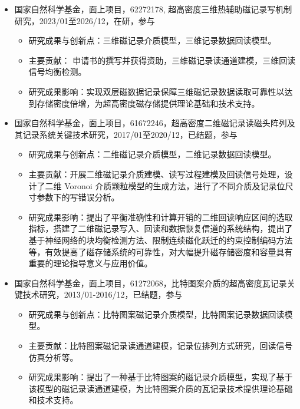 \documentclass[zh]{resume}
\begin{document}
\begin{itemize}
  \item 国家自然科学基金，面上项目，62272178, 超高密度三维热辅助磁记录写机制研究，2023/01至2026/12，在研，参与
  \begin{itemize}
    \item 研究成果与创新点：三维磁记录介质模型，三维记录数据回读模型。
    \item 主要贡献： 申请书的撰写并获得资助，三维磁记录读通道建模，三维回读信号均衡检测。
    \item 研究成果影响：实现双层磁数据记录保障三维磁记录数据读取可靠性以达到存储密度倍增，为超高密度磁存储提供理论基础和技术支持。
  \end{itemize}

  \item 国家自然科学基金，面上项目，61672246，超高密度二维磁记录读磁头阵列及其记录系统关键技术研究，2017/01至2020/12，已结题，参与
  \begin{itemize}
    \item 研究成果与创新点：二维磁记录介质模型，二维记录数据回读模型。
    \item 主要贡献：开展二维磁记录介质建模、读写过程建模及回读信号处理，设计了二维 Voronoi 介质颗粒模型的生成方法，进行了不同介质及记录位尺寸参数下的写错误分析。
    \item 研究成果影响：提出了平衡准确性和计算开销的二维回读响应区间的选取指标，搭建了二维磁记录写入、回读和数据恢复信道的系统结构，提出了基于神经网络的块均衡检测方法、限制连续磁化跃迁的约束控制编码方法等，有效提高了磁存储系统的可靠性，对大幅提升磁存储密度和容量具有重要的理论指导意义与应用价值。
  \end{itemize}

  \item 国家自然科学基金，面上项目，61272068，比特图案介质的超高密度瓦记录关键技术研究，2013/01-2016/12，已结题，参与
  \begin{itemize}
    \item 研究成果与创新点：比特图案磁记录介质模型，比特图案记录数据回读模型。
    \item 主要贡献：比特图案磁记录读通道建模，记录位排列方式研究，回读信号仿真分析等。
    \item 研究成果影响：提出了一种基于比特图案的磁记录介质模型，实现了基于该模型的磁记录读通道建模，为比特图案介质的瓦记录技术提供理论基础和技术支持。
  \end{itemize}
  

\end{itemize}
\end{document}
